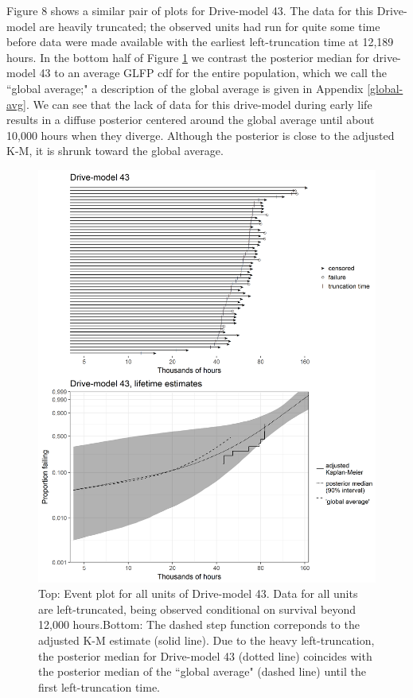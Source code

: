 \documentclass[12pt]{article}
\begin{document}
Figure 8 shows a similar pair of plots for Drive-model 43. The data for this Drive-model are heavily truncated; the observed units had run for quite some time before data were made available with the earliest left-truncation time at 12,189 hours. In the bottom half of Figure \ref{fig:ex-mod-43} we contrast the posterior median for drive-model 43 to an average GLFP cdf for the entire population, which we call the ``global average;" a description of the global average is given in Appendix \ref{global-avg}. We can see that the lack of data for this drive-model during early life results in a diffuse posterior centered around the global average until about 10,000 hours when they diverge. Although the posterior is close to the adjusted K-M, it is shrunk toward the global average.


\begin{figure}
\centering
\includegraphics[height=.8\textheight]{dm43-shrinkage.png}
\caption{\footnotesize Top: Event plot for all units of Drive-model 43. Data for all units are left-truncated, being observed conditional on survival beyond 12,000 hours.\hspace{\textwidth}Bottom: The dashed step function correponds to the adjusted K-M estimate (solid line). Due to the heavy left-truncation, the posterior median for Drive-model 43 (dotted line) coincides with the posterior median of the ``global average" (dashed line) until the first left-truncation time.}
\label{fig:ex-mod-43}
\end{figure}
\end{document}

